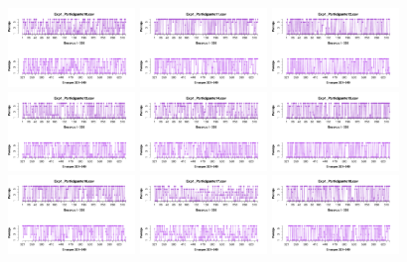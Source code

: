 \begin{figure}[th]
\includegraphics[width=0.30\textwidth]{Figures/Rating_Exp1_P10} \includegraphics[width=0.30\textwidth]{Figures/Rating_Exp1_P11} \includegraphics[width=0.30\textwidth]{Figures/Rating_Exp1_P12}
\includegraphics[width=0.30\textwidth]{Figures/Rating_Exp1_P13} \includegraphics[width=0.30\textwidth]{Figures/Rating_Exp1_P14} \includegraphics[width=0.30\textwidth]{Figures/Rating_Exp1_P15}
\includegraphics[width=0.30\textwidth]{Figures/Rating_Exp1_P16} \includegraphics[width=0.30\textwidth]{Figures/Rating_Exp1_P17} \includegraphics[width=0.30\textwidth]{Figures/Rating_Exp1_P18}

\end{figure}
